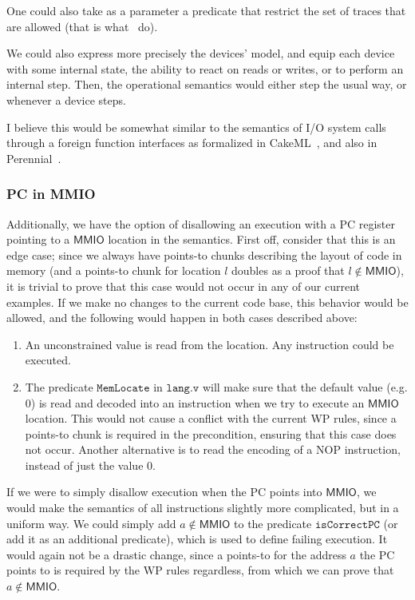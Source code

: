 \documentclass{article}
\newcommand{\X}[1]{\ensuremath{\mathrm{#1}}}
\newcommand{\I}[1]{\ensuremath{\mathtt{#1}}}
\newcommand{\Sf}[1]{\ensuremath{\mathsf{#1}}}
\newcommand{\MMIO}{\Sf{MMIO}\xspace}
\begin{document}
One could also take as a parameter a predicate that restrict the set of traces
that are allowed (that is what~\cite{sammler-2020} do).

We could also express more precisely the devices' model, and equip each device
with some internal state, the ability to react on reads or writes, or to perform
an internal step. Then, the operational semantics would either step the usual
way, or whenever a device steps.

I believe this would be somewhat similar to the semantics of I/O system calls
through a foreign function interfaces as formalized in
CakeML~\cite{cakeml-vstte17io}, and also in Perennial~\cite{perennial-lang}.


\subsubsection{PC in MMIO}
\label{rk:opsem:pc_in_mmio}

Additionally, we have the option of disallowing an execution with a \X{PC}
register pointing to a $\MMIO$ location in the semantics.
%
First off, consider that this is an edge case; since we always have points-to
chunks describing the layout of code in memory (and a points-to chunk for
location $l$ doubles as a proof that $l \not\in \MMIO$), it is trivial to prove
that this case would not occur in any of our current examples.
%
If we make no changes to the current code base, this behavior would be allowed,
and the following would happen in both cases described above:
%
\begin{enumerate}
  \item An unconstrained value is read from the location. Any instruction could
    be executed.
%
  \item The predicate $\I{MemLocate}$ in $\I{lang.v}$ will make sure that the
    default value (e.g. $0$) is read and decoded into an instruction when we try
    to execute an \MMIO location. This would not cause a conflict with the
    current WP rules, since a points-to chunk is required in the precondition,
    ensuring that this case does not occur.
    Another alternative is to read the encoding of a $\X{NOP}$ instruction,
    instead of just the value $0$.
\end{enumerate}
%
If we were to simply disallow execution when the PC points into \MMIO, we would
make the semantics of all instructions slightly more complicated, but in a
uniform way.
%
We could simply add $a \not\in \MMIO$ to the predicate $\I{isCorrectPC}$ (or add
it as an additional predicate), which is used to define failing execution. It
would again not be a drastic change, since a points-to for the address $a$ the
PC points to is required by the WP rules regardless, from which we can prove
that $a \not\in \MMIO$.
\end{document}
